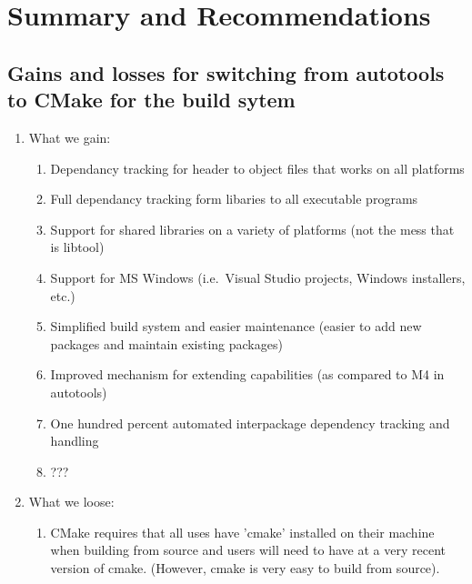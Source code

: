 \documentclass[pdf,ps2pdf,11pt]{SANDreport}
\begin{document}
%
\section{Summary and Recommendations}
%


%
\subsection{Gains and losses for switching from autotools to CMake for the build sytem}
%

\begin{enumerate}

{}\item What we gain:

  \begin{enumerate}

  {}\item Dependancy tracking for header to object files that works on
  all platforms

  {}\item Full dependancy tracking form libaries to all executable
  programs

  {}\item Support for shared libraries on a variety of platforms (not
  the mess that is libtool)

  {}\item Support for MS Windows (i.e.\ Visual Studio projects,
  Windows installers, etc.)

  {}\item Simplified build system and easier maintenance (easier to
  add new packages and maintain existing packages)

  {}\item Improved mechanism for extending capabilities (as compared
  to M4 in autotools)

  {}\item One hundred percent automated interpackage dependency
  tracking and handling

  {}\item ???

  \end{enumerate}

{}\item What we loose:

  \begin{enumerate}

  {}\item CMake requires that all uses have 'cmake' installed on their
  machine when building from source and users will need to have at a
  very recent version of cmake. (However, cmake is very easy to build
  from source).

  \end{enumerate}

\end{enumerate}
\end{document}
